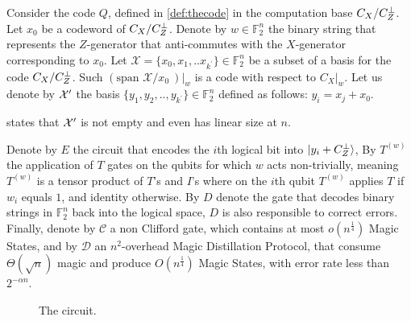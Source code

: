 \begin{definition}
  \label{def:subcode}  
Consider the code $Q$, defined in \cref{def:thecode} in the computation base $C_{X}/C_{Z}^\perp$. Let $x_{0}$ be a codeword of $C_{X}/C_{Z}^\perp$. Denote by $w \in \mathbb{F}_{2}^{n}$ the binary string that represents the $Z$-generator that anti-commutes with the $X$-generator corresponding to $x_{0}$. Let $\mathcal{X} = \{x_{0}, x_{1}, .. x_{k^\prime}\} \in \mathbb{F}_{2}^{n}$ be a subset of a basis for the code $C_{X}/C_{Z}^\perp$. Such $\left(\text{span } \mathcal{X}/x_0 \ \right)|_{w}$ is a \trig code with respect to $C_{X}|_{w}$. Let us denote by $\mathcal{X}^\prime$ the basis $\{ y_{1}, y_{2}, .., y_{k^\prime} \} \in \mathbb{F}_{2}^{n}$ defined as follows: $ y_{i} = x_{j} + x_{0}$.
\end{definition}

  states that $\mathcal{X}^\prime$ is not empty and even has linear size at $n$.


 \begin{definition}
   \label{def:gates} 
 Denote by $E$ the circuit that encodes the $i$th logical bit into $\ket{y_{i}+C_{Z}^{\perp}}$, By $T^{(w)}$ the application of $T$ gates on the qubits for which $w$ acts non-trivially, meaning $T^{(w)}$ is a tensor product of $T$'s and $I$'s where on the $i$th qubit $T^{(w)}$ applies $T$ if $w_{i}$ equals $1$, and identity otherwise. By $D$ denote the gate that decodes binary strings in $\mathbb{F}_{2}^{n}$ back into the logical space, $D$ is also responsible to correct errors.
 Finally, denote by $\mathcal{C}$ a non Clifford gate, which contains at most $o(n^{\frac{1}{4}})$ Magic States, and by $\mathcal{D}$ an $n^{2}$-overhead  Magic Distillation Protocol, that consume $\Theta(\sqrt{n})$ magic and produce $O(n^\frac{1}{4})$ Magic States, with error rate less than $2^{-\alpha n}$.     
 \end{definition}

\begin{figure}
  \label{fig:circ}
  \noindent %
  \scalebox{1.7}{ 
  
}
\caption{ The circuit.   }
\end{figure}

